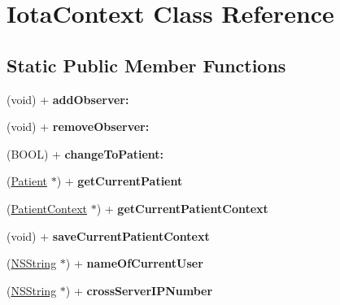 \hypertarget{interface_iota_context}{
\section{IotaContext Class Reference}
\label{interface_iota_context}
}
\subsection*{Static Public Member Functions}
\begin{DoxyCompactItemize}
\item 
\hypertarget{interface_iota_context_ad56c9bbf565204787af3fd70e7afdb10}{
(void) + {\bfseries addObserver:}}
\label{interface_iota_context_ad56c9bbf565204787af3fd70e7afdb10}

\item 
\hypertarget{interface_iota_context_aa5cf6c4327551b9b85b520e7426eee28}{
(void) + {\bfseries removeObserver:}}
\label{interface_iota_context_aa5cf6c4327551b9b85b520e7426eee28}

\item 
\hypertarget{interface_iota_context_a7d9ca6a20ec93d0c167eda60100e769d}{
(BOOL) + {\bfseries changeToPatient:}}
\label{interface_iota_context_a7d9ca6a20ec93d0c167eda60100e769d}

\item 
\hypertarget{interface_iota_context_a901a764870fa6956fac44922c5514d4f}{
(\hyperlink{interface_patient}{Patient} $\ast$) + {\bfseries getCurrentPatient}}
\label{interface_iota_context_a901a764870fa6956fac44922c5514d4f}

\item 
\hypertarget{interface_iota_context_a8d133e7be6d3c76914543a9dc40df1d6}{
(\hyperlink{interface_patient_context}{PatientContext} $\ast$) + {\bfseries getCurrentPatientContext}}
\label{interface_iota_context_a8d133e7be6d3c76914543a9dc40df1d6}

\item 
\hypertarget{interface_iota_context_ac67a5b866d89f1c5d91f7a1fc174d5a7}{
(void) + {\bfseries saveCurrentPatientContext}}
\label{interface_iota_context_ac67a5b866d89f1c5d91f7a1fc174d5a7}

\item 
\hypertarget{interface_iota_context_abafa608da3d409c5c00ddbc60dbe8371}{
(\hyperlink{class_n_s_string}{NSString} $\ast$) + {\bfseries nameOfCurrentUser}}
\label{interface_iota_context_abafa608da3d409c5c00ddbc60dbe8371}

\item 
\hypertarget{interface_iota_context_a80b632cd4b5646af0a114cd172537f67}{
(\hyperlink{class_n_s_string}{NSString} $\ast$) + {\bfseries crossServerIPNumber}}
\label{interface_iota_context_a80b632cd4b5646af0a114cd172537f67}


\end{DoxyCompactItemize}

